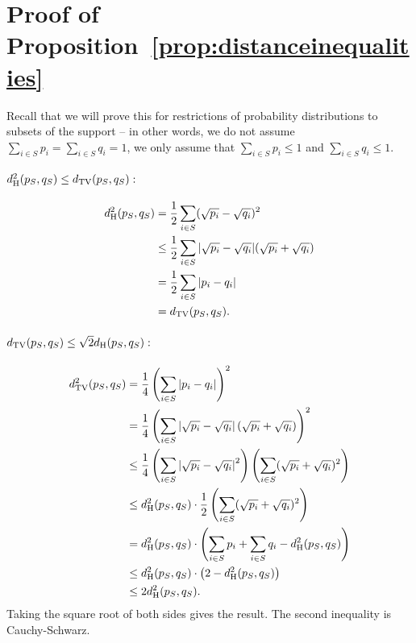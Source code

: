 \section{Proof of Proposition~\ref{prop:distanceinequalities}}
\label{sec:distanceinequalities}
Recall that we will prove this for restrictions of probability distributions to subsets of the support -- in other words, we do not assume $\sum_{i \in S} p_i = \sum_{i \in S} q_i = 1$, we only assume that $\sum_{i \in S} p_i \leq 1$ and $\sum_{i \in S} q_i \leq 1$.
\paragraph{$d_{\mathrm {H}}^2(p_S,q_S) \leq d_{\mathrm {TV}}(p_S,q_S):$}
\begin{align*}
d_{\mathrm {H}}^2(p_S,q_S) &= \frac12 \sum_{i \in S} (\sqrt{p_i} - \sqrt{q_i})^2 \\
&\leq \frac12 \sum_{i \in S} |\sqrt{p_i} - \sqrt{q_i}|(\sqrt{p_i} + \sqrt{q_i}) \\
&= \frac12 \sum_{i \in S} |p_i - q_i| \\
&= d_{\mathrm {TV}}(p_S,q_S).
\end{align*}

\paragraph{$d_{\mathrm {TV}}(p_S,q_S) \leq \sqrt{2}d_{\mathrm {H}}(p_S,q_S):$}
\begin{align*}
d_{\mathrm {TV}}^2(p_S,q_S) &= \frac14 \left(\sum_{i \in S} \left|p_i - q_i\right|\right)^2 \\
&= \frac14 \left(\sum_{i \in S} \left|\sqrt{p_i} -\sqrt{q_i}\right|(\sqrt{p_i} + \sqrt{q_i})\right)^2 \\
&\leq \frac14 \left(\sum_{i \in S} \left|\sqrt{p_i} -\sqrt{q_i}\right|^2\right)\left(\sum_{i \in S}(\sqrt{p_i} + \sqrt{q_i})^2\right) \\
&\leq d_{\mathrm {H}}^2(p_S, q_S) \cdot \frac12 \left(\sum_{i \in S}(\sqrt{p_i} + \sqrt{q_i})^2\right) \\
&= d_{\mathrm {H}}^2(p_S, q_S) \cdot \left(\sum_{i \in S}p_i + \sum_{i \in S} q_i - d_{\mathrm {H}}^2(p_S,q_S)\right) \\
&\leq d_{\mathrm {H}}^2(p_S,q_S) \cdot \left(2 - d_{\mathrm {H}}^2(p_S,q_S)\right) \\
&\leq 2 d_{\mathrm {H}}^2(p_S,q_S).
\end{align*}
Taking the square root of both sides gives the result.
The second inequality is Cauchy-Schwarz.

